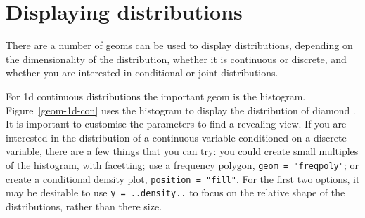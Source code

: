 % 



\section{Displaying distributions}\label{sec:distributions}

There are a number of geoms can be used to display distributions, depending on the dimensionality of the distribution, whether it is continuous or discrete, and whether you are interested in conditional or joint distributions.

For 1d continuous distributions the important geom is the histogram.  Figure~\ref{geom-1d-con} uses the histogram to display the distribution of diamond .  It is important to customise the parameters to find a revealing view.  If you are interested in the distribution of a continuous variable conditioned on a discrete variable, there are a few things that you can try: you could create small multiples of the histogram,  with facetting; use a frequency polygon, {\tt geom = "freqpoly"}; or create a conditional density plot, {\tt position = "fill"}.  For the first two options, it may be desirable to use {\tt y = ..density..} to focus on the relative shape of the distributions, rather than there size. 

% 


